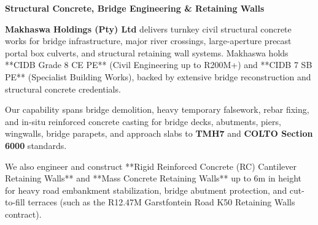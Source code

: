 \hypertarget{sec:bridges}{}

\noindent
\begin{minipage}[t]{0.62\textwidth}
    \vspace{0pt}
    {\large\bfseries\color{mhnavy} Structural Concrete, Bridge Engineering \& Retaining Walls}
    \vspace{0.12cm}

    {\fontsize{9pt}{13pt}\selectfont\color{mhtext}
    \textbf{Makhaswa Holdings (Pty) Ltd} delivers turnkey civil structural concrete works for bridge infrastructure, major river crossings, large-aperture precast portal box culverts, and structural retaining wall systems. Makhaswa holds **CIDB Grade 8 CE PE** (Civil Engineering up to R200M+) and **CIDB 7 SB PE** (Specialist Building Works), backed by extensive bridge reconstruction and structural concrete credentials.
    }

    \vspace{0.22cm}

    {\fontsize{9pt}{13pt}\selectfont\color{mhtext}
    Our capability spans bridge demolition, heavy temporary falsework, rebar fixing, and in-situ reinforced concrete casting for bridge decks, abutments, piers, wingwalls, bridge parapets, and approach slabs to \textbf{TMH7} and \textbf{COLTO Section 6000} standards.
    }

    \vspace{0.22cm}

    {\fontsize{9pt}{13pt}\selectfont\color{mhtext}
    We also engineer and construct **Rigid Reinforced Concrete (RC) Cantilever Retaining Walls** and **Mass Concrete Retaining Walls** up to 6m in height for heavy road embankment stabilization, bridge abutment protection, and cut-to-fill terraces (such as the R12.47M Garstfontein Road K50 Retaining Walls contract).
    }
\end{minipage}
\hfill
